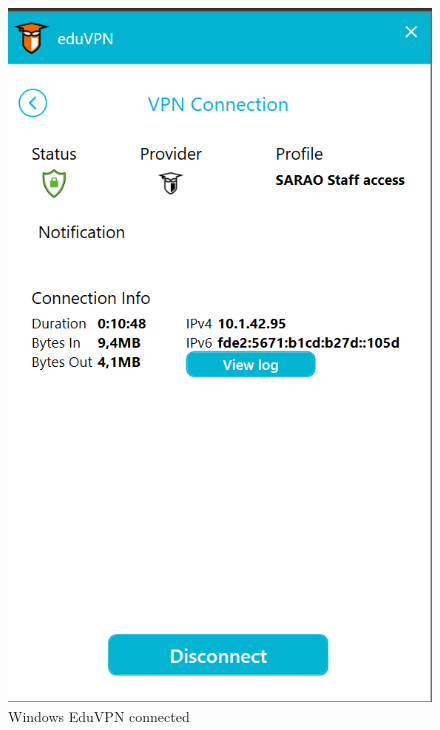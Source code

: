 \begin{figure}[H]
	\centering
	\includegraphics[scale=0.3]{Chapters/images/image58.png}
	
	\caption{Windows EduVPN connected }
	\label{fig:image58}
\end{figure}


